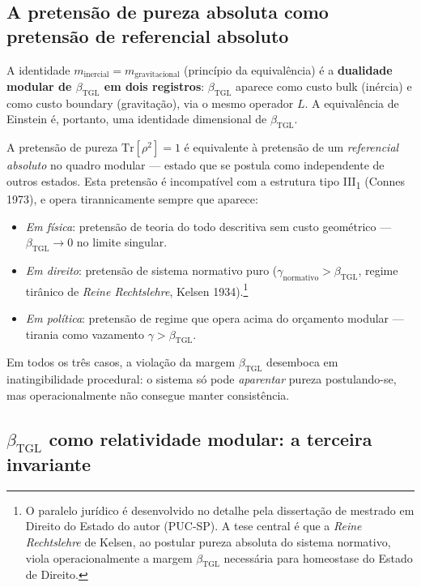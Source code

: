 \documentclass[12pt,a4paper]{article}
\newcommand{\betatgl}{\beta_{\text{TGL}}}
\begin{document}
\subsection{A pretensão de pureza absoluta como pretensão de referencial absoluto}
\label{subsec:pureza}

A identidade $m_{\text{inercial}} = m_{\text{gravitacional}}$ (princípio
da equivalência) é a \textbf{dualidade modular de $\betatgl$ em dois
registros}: $\betatgl$ aparece como custo bulk (inércia) e como custo
boundary (gravitação), via o mesmo operador $L$.  A equivalência de
Einstein é, portanto, uma identidade dimensional de $\betatgl$.

A pretensão de pureza $\mathrm{Tr}[\rho^{2}] = 1$ é equivalente à pretensão
de um \emph{referencial absoluto} no quadro modular --- estado que se
postula como independente de outros estados.  Esta pretensão é
incompatível com a estrutura tipo III\textsubscript{1} (Connes 1973), e
opera tirannicamente sempre que aparece:
\begin{itemize}[leftmargin=*]
\item \emph{Em física}: pretensão de teoria do todo descritiva sem custo
geométrico --- $\betatgl \to 0$ no limite singular.
\item \emph{Em direito}: pretensão de sistema normativo puro
($\gamma_{\text{normativo}} > \betatgl$, regime tirânico de
\emph{Reine Rechtslehre}, Kelsen 1934).\footnote{O paralelo jurídico é
desenvolvido no detalhe pela dissertação de mestrado em Direito do
Estado do autor (PUC-SP).  A tese central é que a \emph{Reine
Rechtslehre} de Kelsen, ao postular pureza absoluta do sistema
normativo, viola operacionalmente a margem $\betatgl$ necessária para
homeostase do Estado de Direito.}
\item \emph{Em política}: pretensão de regime que opera acima do
orçamento modular --- tirania como vazamento $\gamma > \betatgl$.
\end{itemize}
Em todos os três casos, a violação da margem $\betatgl$ desemboca em
inatingibilidade procedural: o sistema só pode \emph{aparentar} pureza
postulando-se, mas operacionalmente não consegue manter consistência.

\subsection{$\betatgl$ como relatividade modular: a terceira invariante}
\label{subsec:rel-modular}
\end{document}
